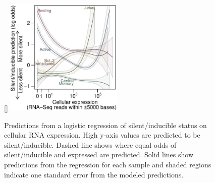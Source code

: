 \documentclass[../sherrill-Mix_thesis.tex]{subfiles}
\begin{document}
	\begin{figure}
		\centering
			[\FBwidth]{
				\includegraphics[width=0.5\textwidth]{rnaGlm.pdf} %
			}{
				\caption[Cellular expression and latency]{Predictions from a logistic regression of silent/inducible status on cellular RNA expression. High y-axis values are predicted to be silent/inducible. Dashed line shows where equal odds of silent/inducible and expressed are predicted. Solid lines show predictions from the regression for each sample and shaded regions indicate one standard error from the modeled predictions.}
				\label{figRnaGlm}
			}
	\end{figure}
\end{document}
